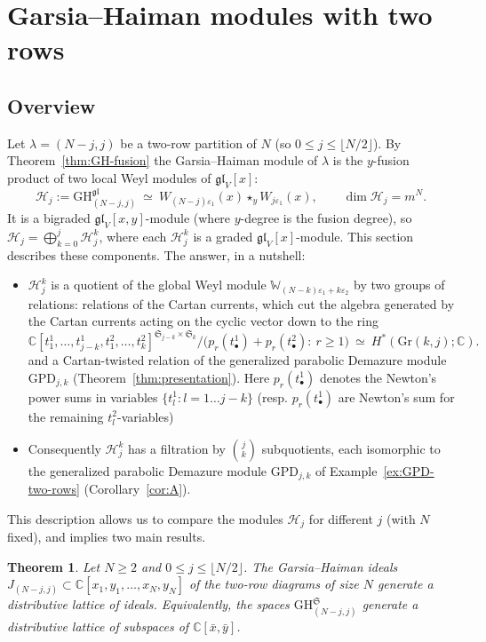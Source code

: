 \documentclass[11pt]{amsart}
\numberwithin{equation}{section}
\newtheorem{theorem}[equation]{Theorem}
\theoremstyle{definition}
\newcommand{\gl}{\mathfrak{gl}}
\newcommand{\bW}{\mathbb{W}}          %
\newcommand{\GPD}{\mathrm{GPD}}         %
\newcommand{\GH}{\mathrm{GH}}         %
\newcommand{\eps}{\varepsilon}
\newcommand{\Gr}{\mathrm{Gr}}
\newcommand{\bx}{\bar{x}}
\newcommand{\by}{\bar{y}}
\newcommand{\sS}{\mathfrak{S}}
\begin{document}
	\section{Garsia--Haiman modules with two rows}\label{sec:two-rows}
	
	\subsection{Overview}\label{ssec:overview}
	
	Let $\lambda=(N-j,j)$ be a two-row partition of $N$ (so $0\le j\le\lfloor N/2\rfloor$). By Theorem~\ref{thm:GH-fusion} the Garsia--Haiman module of $\lambda$ is the $y$-fusion product of two local Weyl modules of $\gl_V[x]$:
	\[
	\mathcal H_j:=\GH^{\gl}_{(N-j,j)}\ \simeq\ W_{(N-j)\eps_1}(x)\star_yW_{j\eps_1}(x),\qquad \dim\mathcal H_j=m^N .
	\]
	It is a bigraded $\gl_V[x,y]$-module (where $y$-degree is the fusion degree), so
	$\mathcal H_j=\bigoplus_{k=0}^{j}\mathcal H_j^k$, where each  $\mathcal H_j^k$ is a graded $\gl_V[x]$-module. This section describes these components. The answer, in a nutshell:
	\begin{itemize}
		\item $\mathcal H_j^k$ is a quotient of the global Weyl module $\bW_{(N-k)\eps_1+k\eps_2}$ by two groups of relations: relations of the Cartan currents, which cut the algebra generated by the Cartan currents acting on the cyclic vector down to the ring
		\[
		\mathbb C[t^1_1,\dots,t^1_{j-k},t^2_1,\dots,t^2_k]^{\sS_{j-k}\times\sS_k}\big/\big(p_r(t^1_\bullet)+p_r(t^2_\bullet):\ r\ge1\big)\ \simeq\ H^*(\Gr(k,j);\mathbb C).
		\]
		and a Cartan-twisted relation of the generalized parabolic Demazure module $\GPD_{j,k}$ (Theorem~\ref{thm:presentation}). 
		Here $p_r(t^1_\bullet)$ denotes the Newton's power sums in variables $\{t^1_l\colon l=1\ldots j-k\}$ (resp. $p_r(t^1_\bullet)$ are Newton's sum for the remaining $t^2_l$-variables)
		
		\item Consequently $\mathcal H_j^k$ has a filtration by $\binom jk$ subquotients, each isomorphic to the generalized parabolic Demazure module $\GPD_{j,k}$ of Example~\ref{ex:GPD-two-rows} (Corollary~\ref{cor:A}).
	\end{itemize}
	This description allows us to compare the modules $\mathcal H_j$ for different $j$ (with $N$ fixed), and implies two main results.
	
	\begin{theorem}
		\label{thm:lattice}
		Let $N\ge2$ and $0\le j\le\lfloor N/2\rfloor$. The Garsia--Haiman ideals $J_{(N-j,j)}\subset\mathbb{C}[x_1,y_1,\dots,x_N,y_N]$ of the two-row diagrams of size $N$ generate a distributive lattice of ideals. Equivalently, the spaces $\GH^{\mathfrak S}_{(N-j,j)}$ generate a distributive lattice of subspaces of $\mathbb{C}[\bx,\by]$.	
	\end{theorem}
	
\end{document}
